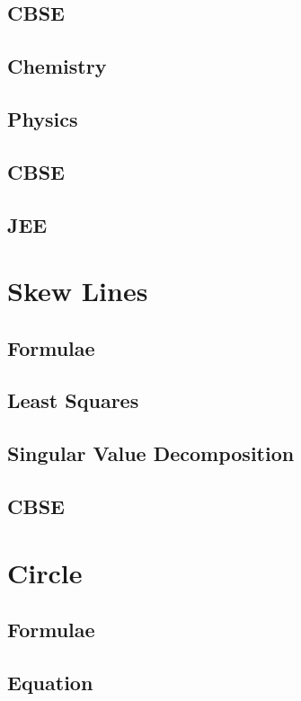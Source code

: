 \documentclass[journal]{IEEEtran}
\begin{document}
\subsection{CBSE}

\subsection{Chemistry}

\subsection{Physics}

\subsection{CBSE}

\subsection{JEE}

\newpage
\section{Skew Lines}
\subsection{Formulae}

\subsection{Least Squares}

\subsection{Singular Value Decomposition}

\subsection{CBSE}

\newpage
\section{Circle}
\subsection{Formulae}

\subsection{Equation}

\end{document}
